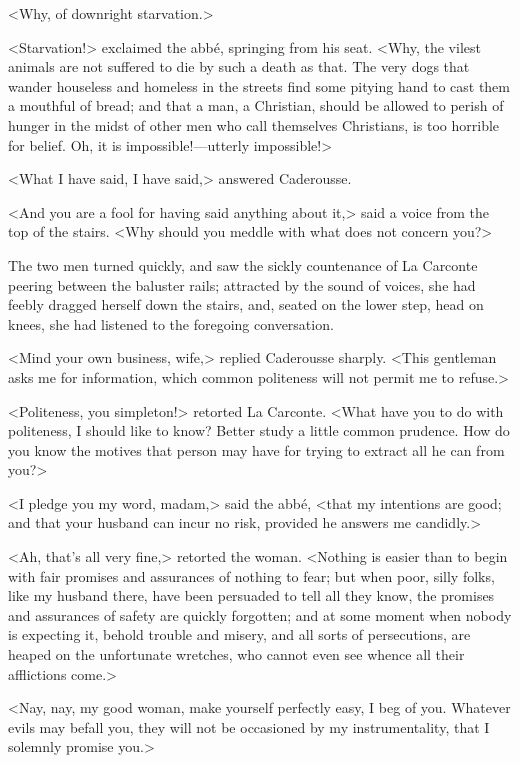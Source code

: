  <Why, of downright starvation.> 

 <Starvation!> exclaimed the abbé, springing from his seat. <Why, the vilest animals are not suffered to die by such a death as that. The very dogs that wander houseless and homeless in the streets find some pitying hand to cast them a mouthful of bread; and that a man, a Christian, should be allowed to perish of hunger in the midst of other men who call themselves Christians, is too horrible for belief. Oh, it is impossible!—utterly impossible!> 

 <What I have said, I have said,> answered Caderousse. 

 <And you are a fool for having said anything about it,> said a voice from the top of the stairs. <Why should you meddle with what does not concern you?> 

 The two men turned quickly, and saw the sickly countenance of La Carconte peering between the baluster rails; attracted by the sound of voices, she had feebly dragged herself down the stairs, and, seated on the lower step, head on knees, she had listened to the foregoing conversation. 

 <Mind your own business, wife,> replied Caderousse sharply. <This gentleman asks me for information, which common politeness will not permit me to refuse.> 

 <Politeness, you simpleton!> retorted La Carconte. <What have you to do with politeness, I should like to know? Better study a little common prudence. How do you know the motives that person may have for trying to extract all he can from you?> 

 <I pledge you my word, madam,> said the abbé, <that my intentions are good; and that your husband can incur no risk, provided he answers me candidly.> 

 <Ah, that's all very fine,> retorted the woman. <Nothing is easier than to begin with fair promises and assurances of nothing to fear; but when poor, silly folks, like my husband there, have been persuaded to tell all they know, the promises and assurances of safety are quickly forgotten; and at some moment when nobody is expecting it, behold trouble and misery, and all sorts of persecutions, are heaped on the unfortunate wretches, who cannot even see whence all their afflictions come.> 

 <Nay, nay, my good woman, make yourself perfectly easy, I beg of you. Whatever evils may befall you, they will not be occasioned by my instrumentality, that I solemnly promise you.> 

